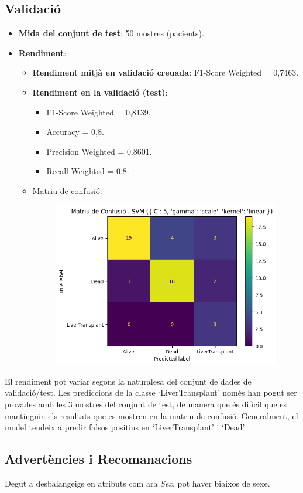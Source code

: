 \subsection{Validació}
\begin{itemize}
\item \textbf{Mida del conjunt de test}: 50 mostres (pacients). 
\item \textbf{Rendiment}:
\begin{itemize}
	\item \textbf{Rendiment mitjà en validació creuada}: F1-Score Weighted = 0,7463.
	\item \textbf{Rendiment en la validació (test)}:
	\begin{itemize}
		\item F1-Score Weighted = 0,8139.
		\item Accuracy = 0,8.
		\item Precision Weighted = 0.8601.
		\item Recall Weighted = 0.8.
	\end{itemize}
	\item Matriu de confusió:
	\begin{figure}[H]
	\centering
	\includegraphics[width=0.6\linewidth]{img/svm-cm.png}
	\end{figure}
\end{itemize}
\end{itemize}

El rendiment pot variar segons la naturalesa del conjunt de dades de validació/test. Les prediccions de la classe `LiverTransplant' només han pogut ser provades amb les 3 mostres del conjunt de test, de manera que és difícil que es mantinguin els resultats que es mostren en la matriu de confusió. Generalment, el model tendeix a predir falsos positius en `LiverTransplant' i `Dead'.

\subsection{Advertències i Recomanacions}
Degut a desbalangeigs en atributs com ara \textit{Sex}, pot haver biaixos de sexe.

